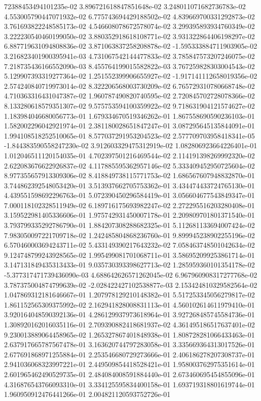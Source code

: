 72388453494101235e-02	3.896721618847851648e-02	3.248011071682736783e-02	4.553005790447071932e-02	6.775743694429188502e-02	4.839669700331292873e-02	3.761693822248585173e-02	4.546608078672578074e-02	3.299395893934760349e-02	3.222230540460199050e-02	3.880352918618108771e-02	3.931322864406198297e-02	6.887719631094808836e-02	3.871063837258208878e-02	-1.595333884711903905e-02	3.216823401900395941e-03	4.731067542144477833e-02	3.785847573207246075e-02	7.218735436166552090e-03	8.455764199015582822e-03	3.767259828303004543e-02	5.129907393319277364e-02	1.251552399906655927e-02	-1.917141112658019356e-02	2.574240840719973014e-02	8.322206568003730209e-02	6.765729310780668748e-02	4.710363316431047387e-02	1.960787490820740595e-02	2.720845702728078366e-02	8.133280618579351307e-02	9.575753594100359922e-02	9.718631904121574627e-02	1.183984046680056773e-01	1.679334670519346262e-01	1.867558690590236103e-01	1.582002296042921974e-01	2.381180028651847247e-01	3.087295645135844091e-01	1.994108518252510065e-01	8.577037291953204523e-02	2.577709703958418341e-05	-1.844383590558247230e-02	3.912603329475312919e-02	1.082806923664226401e-01	1.012046511120154035e-01	4.702397501216469544e-02	2.114191398269992320e-02	2.622083676622926837e-02	4.117885595362957146e-02	5.333409452950725604e-02	8.977355657913309306e-02	8.418849738115771753e-02	1.686567607948832870e-01	3.744862392548053420e-01	3.513937662705753362e-01	3.434474433724765130e-01	4.439551598692296763e-01	5.072390450296584419e-01	3.056604677543849347e-01	7.000118102328511949e-02	6.189716175693982247e-02	2.272295516203280408e-01	3.159522981405336606e-01	1.975742931450007178e-01	2.209809701801371540e-01	3.793799335292786790e-01	1.884207308288682325e-01	5.112681133694007424e-02	7.983050097221709718e-02	1.242485804868236760e-01	9.899945238902255196e-02	6.570460003694243711e-02	5.433149390217643232e-02	7.058463748501042634e-02	9.124748799243928565e-02	1.995499081701068711e-01	3.586952099253861714e-01	3.147131849435313433e-01	9.035730393398627713e-02	1.285959360101354178e-02	-5.377317471739436090e-03	4.688642626571262045e-02	6.967960908317277768e-02	3.787375004874799639e-02	-2.028422427102538877e-03	2.153424810329582564e-02	1.047869312181646667e-01	1.207978129210148382e-01	5.517253345056279817e-02	1.861152565309375992e-02	2.162941828008831113e-01	4.560102614611979410e-01	3.920164048590392136e-01	4.286129937973618964e-01	3.927268485745584736e-01	1.308920162016035116e-01	2.709390882418681937e-02	4.361495186517637401e-02	9.230013889064458965e-02	1.265327867401848938e-01	1.808728281066433463e-01	2.637917665787567478e-01	3.163620744797283058e-01	3.335669364313017526e-01	2.677691868971255884e-01	2.253546680729273666e-01	2.406186278207308737e-01	2.941036068323997221e-01	2.449509854418528421e-01	1.958003762975351614e-01	2.601965462490529735e-01	2.484084008591884440e-01	2.673460695454855096e-01	4.316876543766093310e-01	3.334125595834400158e-01	1.693719318801619744e-01	1.960950912476441266e-01	2.004821120593752726e-01
